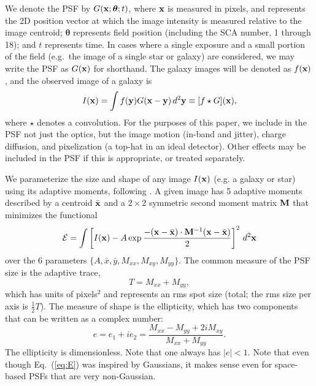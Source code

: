 We denote the PSF by $G({\bf x};{\boldsymbol\theta};t)$, where ${\bf x}$ is measured in pixels, and represents the 2D position vector at which the image intensity is measured relative to the image centroid; ${\boldsymbol\theta}$ represents field position (including the SCA number, 1 through 18); and $t$ represents time. In cases where a single exposure and a small portion of the field (e.g.\ the image of a single star or galaxy) are considered, we may write the PSF as $G({\bf x})$ for shorthand. The galaxy images will be denoted as $f({\bf x})$, and the observed image of a galaxy is
\begin{equation}
I({\bf x}) = \int f({\bf y}) G({\bf x}-{\bf y})\,d^2{\bf y} \equiv [f\star G]({\bf x}),
\end{equation}
where $\star$ denotes a convolution. For the purposes of this paper, we include in the PSF not just the optics, but the image motion (in-band and jitter), charge diffusion, and pixelization (a top-hat in an ideal detector). Other effects may be included in the PSF if this is appropriate, or treated separately. 

We parameterize the size and shape of any image $I({\bf x})$ (e.g. a galaxy or star) using its adaptive moments, following \citet{2002AJ....123..583B}. A given image has 5 adaptive moments described by a centroid $\bar{\bf x}$ and a $2\times 2$ symmetric second moment matrix ${\bf M}$ that minimizes the functional
\begin{equation}
{\cal E} = \int \left[ I({\bf x}) - A \exp \frac{-({\bf x}-\bar{\bf x})\cdot{\bf M}^{-1}({\bf x}-\bar{\bf x})}2 \right]^2 \,d^2{\bf x}
\label{eq:E}
\end{equation}
over the 6 parameters $\{A,\bar x,\bar y,M_{xx},M_{xy},M_{yy}\}$. The common measure of the PSF size is the adaptive trace,
\begin{equation}
T = M_{xx} + M_{yy},
\end{equation}
which has units of pixels$^2$ and represents an rms spot size (total; the rms size per axis is $\frac12T$). The measure of shape is the ellipticity, which has two components that can be written as a complex number:
\begin{equation}
e = e_1+ie_2 = \frac{M_{xx}-M_{yy}+2iM_{xy}}{M_{xx}+M_{yy}}.
\label{eq:edef}
\end{equation}
The ellipticity is dimensionless. Note that one always has $|e|<1$. Note that even though Eq.~(\ref{eq:E}) was inspired by Gaussians, it makes sense even for space-based PSFs that are very non-Gaussian.

